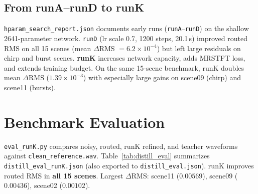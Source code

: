 \subsection{From runA--runD to runK}

\texttt{hparam\_search\_report.json} documents early runs (\texttt{runA}--\texttt{runD}) on the shallow 2641-parameter network. \texttt{runD} (lr scale 0.7, 1200 steps, 20.1\,s) improved routed RMS on all 15 scenes (mean $\Delta$RMS $=6.2\times10^{-4}$) but left large residuals on chirp and burst scenes. \textbf{runK} increases network capacity, adds MRSTFT loss, and extends training budget. On the same 15-scene benchmark, runK doubles mean $\Delta$RMS ($1.39\times10^{-3}$) with especially large gains on scene09 (chirp) and scene11 (bursts).

\section{Benchmark Evaluation}
\label{sec:distill_eval}

\texttt{eval\_runK.py} compares noisy, routed, runK refined, and teacher waveforms against \texttt{clean\_reference.wav}. Table~\ref{tab:distill_eval} summarizes \texttt{distill\_eval\_runK.json} (also exported to \texttt{distill\_eval.json}). runK improves routed RMS in \textbf{all 15 scenes}. Largest $\Delta$RMS: scene11 ($0.00569$), scene09 ($0.00436$), scene02 ($0.00102$).

